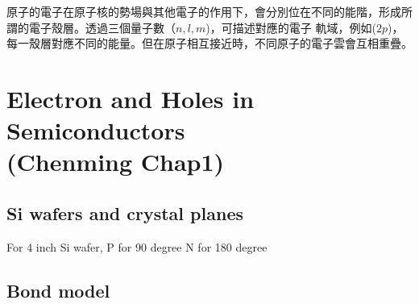 \documentclass[cn,10pt,math=newtx,chinesefont=founder]{../elegantbook}
\begin{document}
原子的電子在原子核的勢場與其他電子的作用下，會分別位在不同的能階，形成所謂的電子殼層。透過三個量子數（$n, l ,m$)，可描述對應的電子
軌域，例如($2p$)，每一殼層對應不同的能量。但在原子相互接近時，不同原子的電子雲會互相重疊。



\chapter{Electron and Holes in Semiconductors \\ (Chenming Chap1)}

\section{Si wafers and crystal planes}

For 4 inch Si wafer, P for 90 degree N for 180 degree
 
\section{Bond model}
\end{document}
